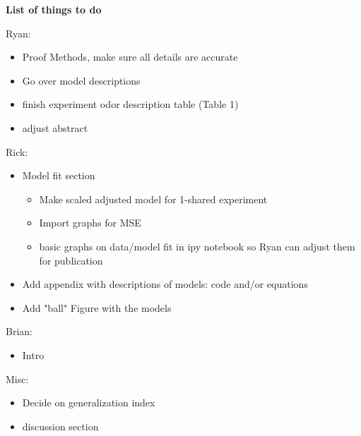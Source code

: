 \textbf{List of things to do}

Ryan:
\begin{itemize}
\item Proof Methods, make sure all details are accurate
\item Go over model descriptions
\item finish experiment odor description table (Table 1)
\item adjust abstract
\end{itemize}
Rick:
\begin{itemize}
\item Model fit section
\begin{itemize}
\finish 
\item Make scaled adjusted model for 1-shared experiment
\item Import graphs for MSE
\item basic graphs on data/model fit in ipy notebook so Ryan can adjust them for publication
\end{itemize}

\item Add appendix with descriptions of models: code and/or equations
\item Add "ball" Figure with the models
\end{itemize}

Brian:
\begin{itemize}
\item Intro
\end{itemize}

Misc:
\begin{itemize}
\item Decide on generalization index
\item discussion section
\end{itemize}
